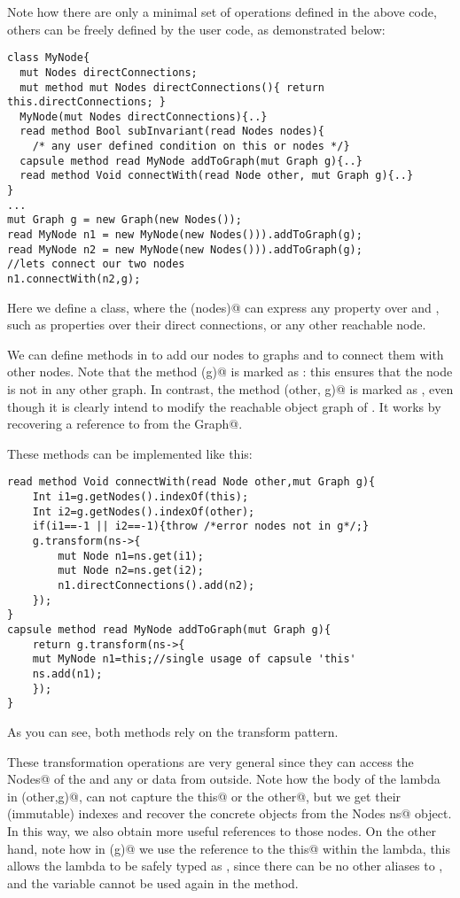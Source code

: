 Note how there are only a minimal set of operations defined in the above code, 
others can be freely defined by the user code, as demonstrated below:

\begin{lstlisting}
class MyNode{
  mut Nodes directConnections;
  mut method mut Nodes directConnections(){ return this.directConnections; }
  MyNode(mut Nodes directConnections){..}
  read method Bool subInvariant(read Nodes nodes){
    /* any user defined condition on this or nodes */}  
  capsule method read MyNode addToGraph(mut Graph g){..}
  read method Void connectWith(read Node other, mut Graph g){..}
}
...
mut Graph g = new Graph(new Nodes());
read MyNode n1 = new MyNode(new Nodes())).addToGraph(g);
read MyNode n2 = new MyNode(new Nodes())).addToGraph(g);
//lets connect our two nodes
n1.connectWith(n2,g);
\end{lstlisting}
Here we define a \Q@MyNode@ class, where the \Q@subInvariant(nodes)@ can express any property over \Q@this@ and \Q@nodes@, such as properties over their direct connections, or any other reachable node.

We can define methods in \Q@MyNode@ to add our nodes
to graphs and to connect them with other nodes.
Note that the method \Q@addToGraph(g)@ is marked as \Q@capsule@: this ensures that the node is not in any other graph.
In contrast, the method \Q@connectWith(other, g)@ is marked as \Q@read@, even though it is clearly intend to modify the reachable object graph of \Q@this@.
It works by recovering a \Q@mut@ reference to \Q@this@ from the \Q@mut Graph@.

These methods can be implemented like this:
\begin{lstlisting}
read method Void connectWith(read Node other,mut Graph g){
	Int i1=g.getNodes().indexOf(this);
	Int i2=g.getNodes().indexOf(other);
	if(i1==-1 || i2==-1){throw /*error nodes not in g*/;}
	g.transform(ns->{
		mut Node n1=ns.get(i1);
		mut Node n2=ns.get(i2);
		n1.directConnections().add(n2);
	});
}
capsule method read MyNode addToGraph(mut Graph g){
	return g.transform(ns->{
	mut MyNode n1=this;//single usage of capsule 'this'
	ns.add(n1);
	});
}
\end{lstlisting}
As you can see, both methods rely on the transform pattern.

These transformation operations are very general since they
can access the \Q@mut Nodes@ of the \Q@Graph@ and 
any \Q@rep@ or \Q@imm@ data from outside.
Note how the body of the \Q@capsule@ lambda in \Q@connectWith(other,g)@, can not capture the \Q@read this@ or the \Q@read other@, but we get their (immutable) indexes 
and recover the concrete objects from the \Q@mut Nodes ns@ object.
In this way, we also obtain more useful \Q@mut@ references to those nodes.
On the other hand, note how in \Q@addToGraph(g)@ we use the reference to the \Q@capsule this@ within the lambda, this allows the lambda to be safely typed as \Q@capsule@, since there can be no other aliases to \Q@this@, and the \Q@this@ variable cannot be used again in the method.